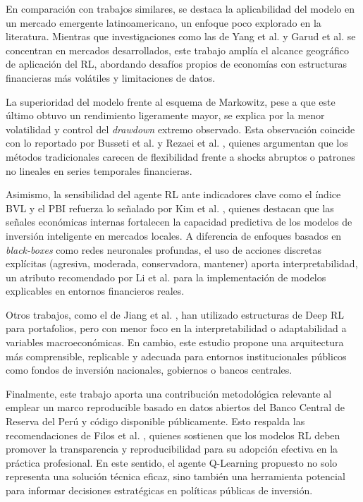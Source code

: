 \documentclass[conference]{IEEEtran}
\begin{document}
	En comparación con trabajos similares, se destaca la aplicabilidad del modelo en un mercado emergente latinoamericano, un enfoque poco explorado en la literatura. Mientras que investigaciones como las de Yang et al. \cite{yang2020deep} y Garud et al. \cite{garud2025fintech} se concentran en mercados desarrollados, este trabajo amplía el alcance geográfico de aplicación del RL, abordando desafíos propios de economías con estructuras financieras más volátiles y limitaciones de datos.
	
	La superioridad del modelo frente al esquema de Markowitz, pese a que este último obtuvo un rendimiento ligeramente mayor, se explica por la menor volatilidad y control del \textit{drawdown} extremo observado. Esta observación coincide con lo reportado por Busseti et al. \cite{busseti2016deep} y Rezaei et al. \cite{rezaei2025taxonomy}, quienes argumentan que los métodos tradicionales carecen de flexibilidad frente a shocks abruptos o patrones no lineales en series temporales financieras.
	
	Asimismo, la sensibilidad del agente RL ante indicadores clave como el índice BVL y el PBI refuerza lo señalado por Kim et al. \cite{kim2019financial}, quienes destacan que las señales económicas internas fortalecen la capacidad predictiva de los modelos de inversión inteligente en mercados locales. A diferencia de enfoques basados en \textit{black-boxes} como redes neuronales profundas, el uso de acciones discretas explícitas (agresiva, moderada, conservadora, mantener) aporta interpretabilidad, un atributo recomendado por Li et al. \cite{li2019reinforcement} para la implementación de modelos explicables en entornos financieros reales.
	
	Otros trabajos, como el de Jiang et al. \cite{jiang2017framework}, han utilizado estructuras de Deep RL para portafolios, pero con menor foco en la interpretabilidad o adaptabilidad a variables macroeconómicas. En cambio, este estudio propone una arquitectura más comprensible, replicable y adecuada para entornos institucionales públicos como fondos de inversión nacionales, gobiernos o bancos centrales.
	
	Finalmente, este trabajo aporta una contribución metodológica relevante al emplear un marco reproducible basado en datos abiertos del Banco Central de Reserva del Perú y código disponible públicamente. Esto respalda las recomendaciones de Filos et al. \cite{filos2019trading}, quienes sostienen que los modelos RL deben promover la transparencia y reproducibilidad para su adopción efectiva en la práctica profesional. En este sentido, el agente Q-Learning propuesto no solo representa una solución técnica eficaz, sino también una herramienta potencial para informar decisiones estratégicas en políticas públicas de inversión.
	
\end{document}
